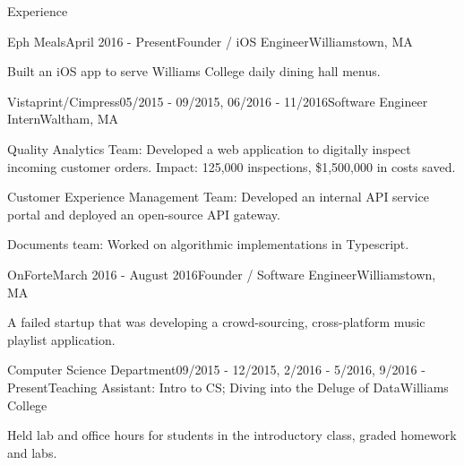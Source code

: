 \documentclass{resume} %
\begin{document}
\begin{rSection}{Experience}

\begin{rSubsection}{Eph Meals}{April 2016 - Present}{Founder / iOS Engineer}{Williamstown, MA}
  \item Built an iOS app to serve Williams College daily dining hall menus.
\end{rSubsection}


\begin{rSubsection}{Vistaprint/Cimpress}{05/2015 - 09/2015, 06/2016 - 11/2016}{Software Engineer Intern}{Waltham, MA}
  \item Quality Analytics Team: Developed a web application to digitally inspect incoming customer orders. Impact: 125,000 inspections, \$1,500,000 in costs saved.
  \item Customer Experience Management Team: Developed an internal API service portal and deployed an open-source API gateway.
  \item Documents team: Worked on algorithmic implementations in Typescript.
\end{rSubsection}


\begin{rSubsection}{OnForte}{March 2016 - August 2016}{Founder / Software Engineer}{Williamstown, MA}
  \item A failed startup that was developing a crowd-sourcing, cross-platform music playlist application.
\end{rSubsection}





\begin{rSubsection}{Computer Science Department}{09/2015 - 12/2015, 2/2016 - 5/2016, 9/2016 - Present}{Teaching Assistant: Intro to CS; Diving into the Deluge of Data}{Williams College}
  \item Held lab and office hours for students in the introductory class, graded homework and labs.

\end{rSubsection}
\end{rSection}
\end{document}

